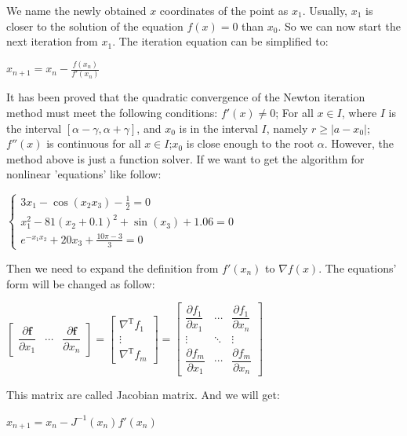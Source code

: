 \documentclass[12pt, a4paper, oneside]{ctexart}
\begin{document}
\begin{spacing}{2.0}
We name the newly obtained $x$ coordinates of the point as $x_1$.
Usually, $x_1$ is closer to the solution of the equation $f(x)=0$ than $x_0$.
So we can now start the next iteration from $x_1$. The iteration equation can be simplified to:
\begin{center}
    $x_{n+1} = x_n - \frac{f(x_n)}{f'(x_n)}$
\end{center}

It has been proved that the quadratic convergence of the Newton iteration method must meet the following conditions: 
$f'(x) \ne 0$; For all $x\in I$, where $I$ is the 
interval $[\alpha - \gamma, \alpha + \gamma]$, and $x_0$ is in the interval $I$, 
namely $ r \geqslant \left| a-x_0 \right|$;
$f''(x)$ is continuous for all $x\in I$;$x_0$ is close enough to the root $\alpha$.
However, the method above is just a function solver. If we want to get the algorithm for nonlinear 'equations' like follow:

\begin{center}
    $    \begin{cases}
            3x_{1} - \cos{(x_{2}x_{3})} - \frac{1}{2} = 0 \\
            x_{1}^{2} - 81(x_{2} + 0.1)^{2} + \sin(x_{3}) + 1.06 = 0 \\
            e^{-x_{1}x_{2}} + 20x_{3} + \frac{10\pi - 3}{3} = 0
        \end{cases} $       
\end{center}

Then we need to expand the definition from $f'(x_n)$ to $\nabla f(x)$. The equations' form will be changed as follow\cite{enwiki:1141352419}:
\begin{center}
    $\begin{bmatrix}
        \dfrac{\partial \mathbf{f}}{\partial x_1} & \cdots & \dfrac{\partial \mathbf{f}}{\partial x_n}
      \end{bmatrix}
      = \begin{bmatrix}
        \nabla^{\mathrm T} f_1 \\  
        \vdots \\
        \nabla^{\mathrm T} f_m   
      \end{bmatrix}
      = \begin{bmatrix}
          \dfrac{\partial f_1}{\partial x_1} & \cdots & \dfrac{\partial f_1}{\partial x_n}\\
          \vdots                             & \ddots & \vdots\\
          \dfrac{\partial f_m}{\partial x_1} & \cdots & \dfrac{\partial f_m}{\partial x_n}
      \end{bmatrix}$
\end{center}
This matrix are called Jacobian matrix. And we will get:
\begin{center}
    $x_{n+1} = x_n - J^{-1}(x_n)f'(x_n)$
\end{center}

\end{spacing}
\end{document}
